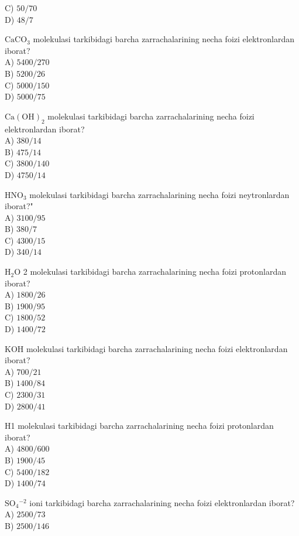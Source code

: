 C) $50 / 70$\\
D) $48 / 7$
  \item $\mathrm{CaCO}_{3}$ molekulasi tarkibidagi barcha zarrachalarining necha foizi elektronlardan iborat?\\
A) $5400 / 270$\\
B) $5200 / 26$\\
C) $5000 / 150$\\
D) $5000 / 75$
  \item $\mathrm{Ca}(\mathrm{OH})_{2}$ molekulasi tarkibidagi barcha zarrachalarining necha foizi elektronlardan iborat?\\
A) $380 / 14$\\
B) $475 / 14$\\
C) $3800 / 140$\\
D) $4750 / 14$
  \item $\mathrm{HNO}_{3}$ molekulasi tarkibidagi barcha zarrachalarining necha foizi neytronlardan iborat?"\\
A) $3100 / 95$\\
B) $380 / 7$\\
C) $4300 / 15$\\
D) $340 / 14$
  \item $\mathrm{H}_{2} \mathrm{O}$ 2 molekulasi tarkibidagi barcha zarrachalarining necha foizi protonlardan iborat?\\
A) $1800 / 26$\\
B) $1900 / 95$\\
C) $1800 / 52$\\
D) $1400 / 72$
  \item KOH molekulasi tarkibidagi barcha zarrachalarining necha foizi elektronlardan iborat?\\
A) $700 / 21$\\
B) $1400 / 84$\\
C) $2300 / 31$\\
D) $2800 / 41$
  \item H1 molekulasi tarkibidagi barcha zarrachalarining necha foizi protonlardan iborat?\\
A) $4800 / 600$\\
B) $1900 / 45$\\
C) $5400 / 182$\\
D) $1400 / 74$
  \item $\mathrm{SO}_{4}{ }^{-2}$ ioni tarkibidagi barcha zarrachalarining necha foizi elektronlardan iborat?\\
A) $2500 / 73$\\
B) $2500 / 146$\\
